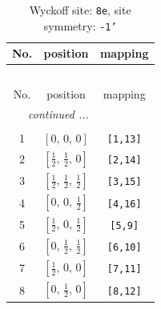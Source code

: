\documentclass[fleqn,8pt]{jsarticle}
\begin{document}
\renewcommand{\arraystretch}{1.2}
\begin{longtable}{ccc}
\caption{Wyckoff site: {\tt 8e}, site symmetry: {\tt -1'}}
 \\
 \hline \hline
No. & position & mapping \\ \hline \endfirsthead

\multicolumn{2}{l}{\tablename\ \thetable{}} \\
 \hline \hline
No. & position & mapping \\ \hline \endhead

 \hline \hline
\multicolumn{2}{r}{\footnotesize\it continued ...} \\ \endfoot

 \hline \hline
\multicolumn{2}{r}{} \\ \endlastfoot

1 & $\left[ 0,\, 0,\, 0 \right]$ & {\tt [1,13]} \\ \hline
2 & $\left[ \frac{1}{2},\, \frac{1}{2},\, 0 \right]$ & {\tt [2,14]} \\ \hline
3 & $\left[ \frac{1}{2},\, \frac{1}{2},\, \frac{1}{2} \right]$ & {\tt [3,15]} \\ \hline
4 & $\left[ 0,\, 0,\, \frac{1}{2} \right]$ & {\tt [4,16]} \\ \hline
5 & $\left[ \frac{1}{2},\, 0,\, \frac{1}{2} \right]$ & {\tt [5,9]} \\ \hline
6 & $\left[ 0,\, \frac{1}{2},\, \frac{1}{2} \right]$ & {\tt [6,10]} \\ \hline
7 & $\left[ \frac{1}{2},\, 0,\, 0 \right]$ & {\tt [7,11]} \\ \hline
8 & $\left[ 0,\, \frac{1}{2},\, 0 \right]$ & {\tt [8,12]} \\
\end{longtable}
\renewcommand{\arraystretch}{1.2}
\end{document}
